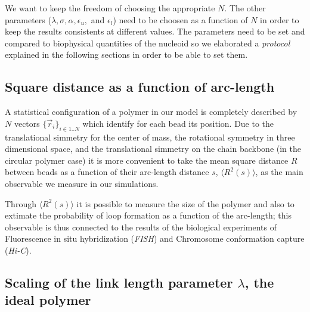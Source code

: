 \documentclass[12pt,a4paper,notitlepage]{article}
\begin{document}
We want to keep the freedom of choosing the appropriate $N$. The other
parameters ($\lambda, \sigma, \alpha, \epsilon_u,$ and $\epsilon_l$)
need to be choosen as a function of $N$ in order to keep the 
results consistents at different values. The parameters need to be set
and compared to biophysical quantities of the nucleoid so we elaborated
a {\it protocol} explained in the following sections in order to be
able to set them.

\subsection{Square distance as a function of arc-length}
A statistical configuration of a polymer in our model is completely
described by $N$ vectors $\{ \vec r_i \}_{i \in 1 .. N}$ which
identify for each bead its position. Due to the translational simmetry
for the center of mass, the rotational symmetry in three dimensional
space, and the translational simmetry on the chain backbone (in
the circular polymer case) it is more convenient to take the mean
square distance $R$ between beads as a function of their arc-length
distance $s$, $\langle R^2 (s) \rangle$, as the main observable we
measure in our simulations.

Through $\langle R^2 (s) \rangle$ it is possible to measure the size
of the polymer and also to extimate the probability of loop formation
as a function of the arc-length; this observable is thus connected to
the results of the biological experiments of Fluorescence in situ
hybridization ({\it FISH}) and Chromosome conformation capture
({\it Hi-C}).

\subsection{Scaling of the link length parameter $\lambda$, the ideal polymer}
\end{document}

